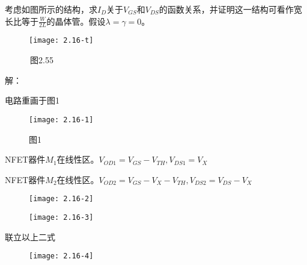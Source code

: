 


考虑如图所示的结构，求$I_D$关于$V_{GS}$和$V_{DS}$的函数关系，并证明这一结构可看作宽长比等于$\frac{W}{2L}$的晶体管。假设$ \lambda = \gamma =0$。

		\begin{figure}[H] %
	\begin{minipage}{\linewidth}
		\texttt{[image: 2.16-t]}
	\end{minipage}
\end{figure}

~~~~~~图2.55

解：

电路重画于图1

		\begin{figure}[H] %
	\begin{minipage}{\linewidth}
		\texttt{[image: 2.16-1]}
	\end{minipage}
	\caption*{图1} %
\end{figure}

\scalebox{3}{（1）}

NFET器件$M_1$在线性区。$V_{OD1}=V_{GS}-V_{TH},V_{DS1}=V_{X}$

NFET器件$M_2$在线性区。$V_{OD2}=V_{GS}-V_{X}-V_{TH},V_{DS2}=V_{DS}-V_{X}$

\begin{figure}[H] %
	\begin{minipage}{\linewidth}
		\texttt{[image: 2.16-2]}
	\end{minipage}
\end{figure}

\begin{figure}[H] %
	\begin{minipage}{\linewidth}
		\texttt{[image: 2.16-3]}
	\end{minipage}
\end{figure}

联立以上二式

\begin{figure}[H] %
	\begin{minipage}{\linewidth}
		\texttt{[image: 2.16-4]}
	\end{minipage}
\end{figure}

